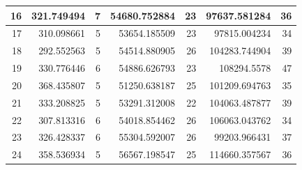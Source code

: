 \begin{table}
\begin{adjustwidth}{}{}
{{\begin{tabular}{|r|r|r|r|r|r|r|}
\hline
16                                         & 321.749494                   & 7                                     & 54680.752884                   & 23                                    & 97637.581284                 & 36                                     \\ 
\hline
17                                         & 310.098661                   & 5                                     & 53654.185509                   & 23                                    & 97815.004234                 & 34                                     \\ 
\hline
18                                         & 292.552563                   & 5                                     & 54514.880905                   & 26                                    & 104283.744904                & 39                                     \\ 
\hline
19                                         & 330.776446                   & 6                                     & 54886.626793                   & 23                                    & 108294.5578                  & 47                                     \\ 
\hline
20                                         & 368.435807                   & 5                                     & 51250.638187                   & 25                                    & 101209.694763                & 35                                     \\ 
\hline
21                                         & 333.208825                   & 5                                     & 53291.312008                   & 22                                    & 104063.487877                & 39                                     \\ 
\hline
22                                         & 307.813316                   & 6                                     & 54018.854462                   & 26                                    & 106063.043762                & 34                                     \\ 
\hline
23                                         & 326.428337                   & 6                                     & 55304.592007                   & 26                                    & 99203.966431                 & 37                                     \\ 
\hline
24                                         & 358.536934                   & 5                                     & 56567.198547                   & 25                                    & 114660.357567                & 36                                     \\ 

\end{tabular}}}
\end{adjustwidth}
\end{table}
